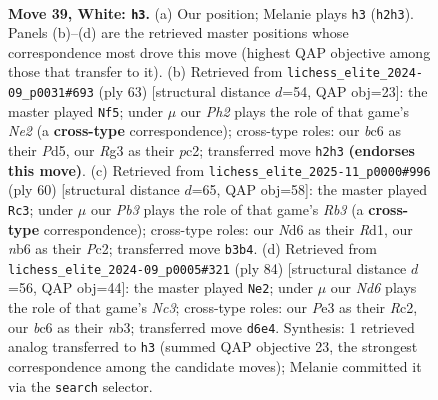 \documentclass[11pt]{article}
\begin{document}
\clearpage

\begin{figure}[p]\centering
\begin{subfigure}{0.46\textwidth}\centering
\resizebox{\linewidth}{!}{%
\newchessgame
\chessboard[
  setfen={5k2/2r2p1p/rnbN2p1/p3p1P1/8/1P2P1R1/P3K1PP/RN6 w - - 0 39},
  showmover=false,
  pgfstyle=straightmove, color=movearrow, markmove={h2-h3}
]}
\caption{}
\end{subfigure}\hfill
\begin{subfigure}{0.46\textwidth}\centering
\resizebox{\linewidth}{!}{%
\newchessgame
\chessboard[
  setfen={5r2/p1r1np1k/3Np2p/2ppP2P/5P2/PP6/2P3R1/2K4R b - - 9 32},
  showmover=false,
  pgfstyle=straightmove, color=movearrow, markmove={e7-f5}
]}
\caption{}
\end{subfigure}
\\[4pt]
\begin{subfigure}{0.46\textwidth}\centering
\resizebox{\linewidth}{!}{%
\newchessgame
\chessboard[
  setfen={r7/rn1bk1pp/p1p2p2/P3p3/1N6/1R2P3/1PP1B1PP/3R2K1 w - - 12 31},
  showmover=false,
  pgfstyle=straightmove, color=movearrow, markmove={b3-c3}
]}
\caption{}
\end{subfigure}\hfill
\begin{subfigure}{0.46\textwidth}\centering
\resizebox{\linewidth}{!}{%
\newchessgame
\chessboard[
  setfen={1r3b2/r4pk1/2p5/3p4/p2P1PB1/1nN3P1/1PR2PK1/7R w - - 12 43},
  showmover=false,
  pgfstyle=straightmove, color=movearrow, markmove={c3-e2}
]}
\caption{}
\end{subfigure}
\caption{\textbf{Move 39, White: \texttt{h3}.} (a) Our position; Melanie plays \texttt{h3} (\texttt{h2h3}). Panels (b)--(d) are the retrieved master positions whose correspondence most drove this move (highest QAP objective among those that transfer to it). (b) Retrieved from \texttt{lichess\_elite\_2024-09\_p0031\#693} (ply 63) [structural distance $d$=54, QAP obj=23]: the master played \texttt{Nf5}; under $\mu$ our \emph{Ph2} plays the role of that game's \emph{Ne2} (a \textbf{cross-type} correspondence); cross-type roles: our \emph{b}c6 as their \emph{P}d5, our \emph{R}g3 as their \emph{p}c2; transferred move \texttt{h2h3} \textbf{(endorses this move)}. (c) Retrieved from \texttt{lichess\_elite\_2025-11\_p0000\#996} (ply 60) [structural distance $d$=65, QAP obj=58]: the master played \texttt{Rc3}; under $\mu$ our \emph{Pb3} plays the role of that game's \emph{Rb3} (a \textbf{cross-type} correspondence); cross-type roles: our \emph{N}d6 as their \emph{R}d1, our \emph{n}b6 as their \emph{P}c2; transferred move \texttt{b3b4}. (d) Retrieved from \texttt{lichess\_elite\_2024-09\_p0005\#321} (ply 84) [structural distance $d$=56, QAP obj=44]: the master played \texttt{Ne2}; under $\mu$ our \emph{Nd6} plays the role of that game's \emph{Nc3}; cross-type roles: our \emph{P}e3 as their \emph{R}c2, our \emph{b}c6 as their \emph{n}b3; transferred move \texttt{d6e4}. Synthesis: 1 retrieved analog transferred to \texttt{h3} (summed QAP objective 23, the strongest correspondence among the candidate moves); Melanie committed it via the \texttt{search} selector.}
\label{fig:thought-m76}
\end{figure}
\end{document}
